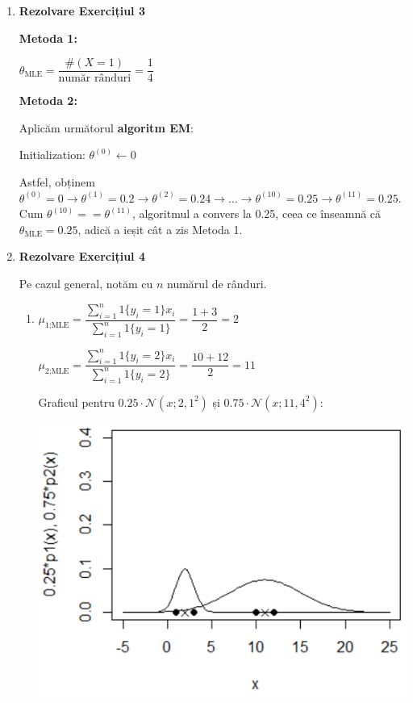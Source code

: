 \documentclass[12pt]{article}
\begin{document}
\begin{enumerate}
\begin{enumerate}
			
		\end{enumerate}
		\newpage
		\item \textbf{Rezolvare Exercițiul 3}
		
		\textbf{Metoda 1:}
		
		$\theta_\text{MLE} = \dfrac{\#(X=1)}{\text{număr rânduri}} = \dfrac{1}{4}$
		
		\textbf{Metoda 2:}
		
		Aplicăm următorul \textbf{algoritm EM}:
		
		\begin{algorithmic}
			\STATE Initialization: $\theta^{(0)}\gets 0$
			\ENDFOR
		\end{algorithmic}
		
		Astfel, obținem $\theta^{(0)} = 0 \rightarrow \theta^{(1)} = 0.2 \rightarrow \theta^{(2)} = 0.24 \rightarrow \dots \rightarrow \theta^{(10)} = 0.25 \rightarrow \theta^{(11)} = 0.25$. Cum $\theta^{(10)} == \theta^{(11)}$, algoritmul a convers la 0.25, ceea ce înseamnă că $\theta_\text{MLE} = 0.25$, adică a ieșit cât a zis Metoda 1.
		
		\item \textbf{Rezolvare Exercițiul 4}
		
		Pe cazul general, notăm cu $n$ numărul de rânduri.
		\begin{enumerate}
			\item $\mu_\text{1;MLE} = \dfrac{\sum_{i=1}^n{1\{y_i=1\} x_i}}{{\sum_{i=1}^n}{1\{y_i=1\}}} = \dfrac{1+3}{2} = 2$
			
			$\mu_\text{2;MLE} = \dfrac{\sum_{i=1}^n{1\{y_i=2\} x_i}}{{\sum_{i=1}^n}{1\{y_i=2\}}} = \dfrac{10+12}{2} = 11$
			
			\newpage
			
			Graficul pentru $0.25 \cdot \mathcal{N}(x;2,1^2)$ și $0.75 \cdot \mathcal{N}(x;11,4^2)$:
								
			\begin{center}
				\includegraphics{screenshot009}
			\end{center}
			

\end{enumerate}
\end{enumerate}
\end{document}
